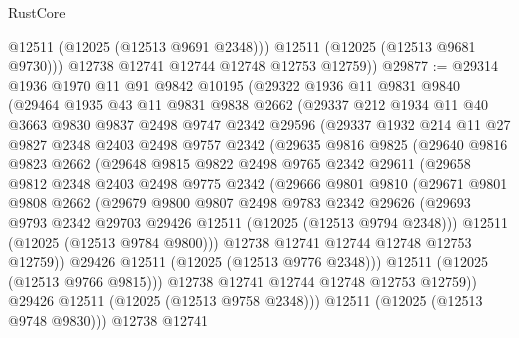 \begin{lexlean}{RustCore}
\begin{coremodule}
            @12511
            (@12025 (@12513 @9691 @2348)))
          @12511
          (@12025 (@12513 @9681 @9730)))
        @12738
        @12741
        @12744
        @12748
        @12753
        @12759))
@29877 := @29314
    @1936
    @1970
    @11
    @91
    @9842
    @10195
    (@29322
      @1936
      @11
      @9831
      @9840
      (@29464
        @1935
        @43
        @11
        @9831
        @9838
        @2662
        (@29337
          @212
          @1934
          @11
          @40
          @3663
          @9830
          @9837
          @2498
          @9747
          @2342
          @29596
          (@29337
            @1932
            @214
            @11
            @27
            @9827
            @2348
            @2403
            @2498
            @9757
            @2342
            (@29635
              @9816
              @9825
              (@29640
                @9816
                @9823
                @2662
                (@29648
                  @9815
                  @9822
                  @2498
                  @9765
                  @2342
                  @29611
                  (@29658
                    @9812
                    @2348
                    @2403
                    @2498
                    @9775
                    @2342
                    (@29666
                      @9801
                      @9810
                      (@29671
                        @9801
                        @9808
                        @2662
                        (@29679
                          @9800
                          @9807
                          @2498
                          @9783
                          @2342
                          @29626
                          (@29693 @9793 @2342 @29703 @29426 @12511 (@12025 (@12513 @9794 @2348)))
                          @12511
                          (@12025 (@12513 @9784 @9800)))
                        @12738
                        @12741
                        @12744
                        @12748
                        @12753
                        @12759))
                    @29426
                    @12511
                    (@12025 (@12513 @9776 @2348)))
                  @12511
                  (@12025 (@12513 @9766 @9815)))
                @12738
                @12741
                @12744
                @12748
                @12753
                @12759))
            @29426
            @12511
            (@12025 (@12513 @9758 @2348)))
          @12511
          (@12025 (@12513 @9748 @9830)))
        @12738
        @12741

\end{coremodule}
\end{lexlean}
